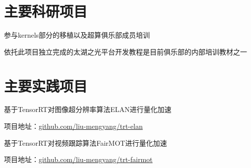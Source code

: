 \documentclass[]{deedy-resume-openfont}
\begin{document}
\begin{minipage}[t]{0.73\textwidth}


	\section{主要科研项目}
	\vspace{\topsep}
	\begin{tightemize}
		\item 参与kernels部分的移植以及超算俱乐部成员培训
		\item 依托此项目独立完成的太湖之光平台开发教程是目前俱乐部的内部培训教材之一
	\end{tightemize}
    \sectionsep

    \section{主要实践项目}
	\begin{tightemize}
		\item 基于TensorRT对图像超分辨率算法ELAN进行量化加速
		\item 项目地址：\href{https://github.com/liu-mengyang/trt-elan}{github.com/liu-mengyang/trt-elan}
	\end{tightemize}
	\sectionsep

	\begin{tightemize}
		\item 基于TensorRT对视频跟踪算法FairMOT进行量化加速
		\item 项目地址：\href{https://github.com/liu-mengyang/trt-fairmot}{github.com/liu-mengyang/trt-fairmot}
	\end{tightemize}
	\sectionsep



\end{minipage}
\end{document}
